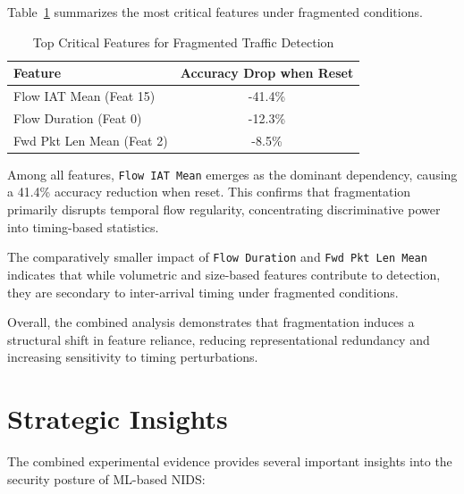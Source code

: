 Table~\ref{tab:feature_importance} summarizes the most critical features under fragmented conditions.

\begin{table}[h]
\centering
\caption{Top Critical Features for Fragmented Traffic Detection}
\label{tab:feature_importance}
\begin{tabular}{lc}
\hline
\textbf{Feature} & \textbf{Accuracy Drop when Reset} \\ \hline
Flow IAT Mean (Feat 15) & -41.4\% \\
Flow Duration (Feat 0)  & -12.3\% \\
Fwd Pkt Len Mean (Feat 2) & -8.5\% \\ \hline
\end{tabular}
\end{table}

Among all features, \texttt{Flow IAT Mean} emerges as the dominant dependency, causing a 41.4\% accuracy reduction when reset. This confirms that fragmentation primarily disrupts temporal flow regularity, concentrating discriminative power into timing-based statistics.

The comparatively smaller impact of \texttt{Flow Duration} and \texttt{Fwd Pkt Len Mean} indicates that while volumetric and size-based features contribute to detection, they are secondary to inter-arrival timing under fragmented conditions.

Overall, the combined analysis demonstrates that fragmentation induces a structural shift in feature reliance, reducing representational redundancy and increasing sensitivity to timing perturbations.
\section{Strategic Insights}

The combined experimental evidence provides several important insights into the security posture of ML-based NIDS:

